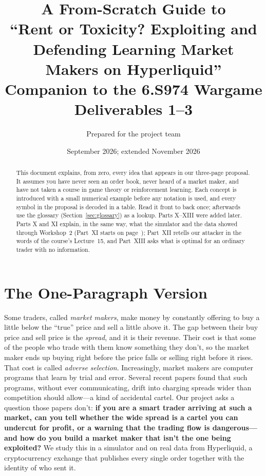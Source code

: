 \documentclass[11pt]{article}
\title{\textbf{A From-Scratch Guide to\\ ``Rent or Toxicity? Exploiting and Defending Learning Market Makers on Hyperliquid''}\\[4pt]
\large Companion to the 6.S974 Wargame Deliverables 1--3}
\author{Prepared for the project team}
\date{September 2026; extended November 2026}
\begin{document}
\maketitle

\begin{abstract}
\noindent This document explains, from zero, every idea that appears in our three-page proposal. It assumes you have never seen an order book, never heard of a market maker, and have not taken a course in game theory or reinforcement learning. Each concept is introduced with a small numerical example before any notation is used, and every symbol in the proposal is decoded in a table. Read it front to back once; afterwards use the glossary (Section~\ref{sec:glossary}) as a lookup. Parts X--XIII were added later. Parts X and XI explain, in the same way, what the simulator and the data showed through Workshop~2 (Part~XI starts on page~\pageref{sec:ws12}); Part~XII retells our attacker in the words of the course's Lecture~15, and Part~XIII asks what is optimal for an ordinary trader with no information.
\end{abstract}

\tableofcontents
\newpage

\section{The One-Paragraph Version}
Some traders, called \emph{market makers}, make money by constantly offering to buy a little below the ``true'' price and sell a little above it. The gap between their buy price and sell price is the \emph{spread}, and it is their revenue. Their cost is that some of the people who trade with them know something they don't, so the market maker ends up buying right before the price falls or selling right before it rises. That cost is called \emph{adverse selection}. Increasingly, market makers are computer programs that learn by trial and error. Several recent papers found that such programs, without ever communicating, drift into charging spreads wider than competition should allow---a kind of accidental cartel. Our project asks a question those papers don't: \textbf{if you are a smart trader arriving at such a market, can you tell whether the wide spread is a cartel you can undercut for profit, or a warning that the trading flow is dangerous---and how do you build a market maker that isn't the one being exploited?} We study this in a simulator and on real data from Hyperliquid, a cryptocurrency exchange that publishes every single order together with the identity of who sent it.
\end{document}
